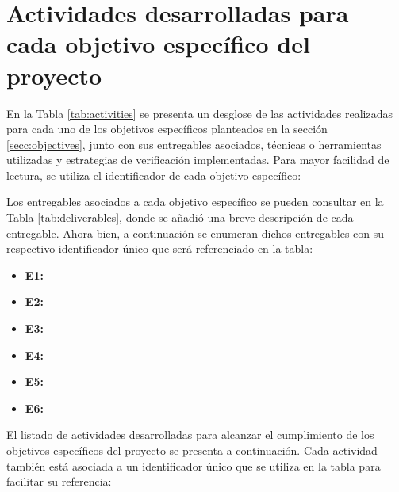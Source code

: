 \section{Actividades desarrolladas para cada objetivo específico del proyecto}

En la Tabla \ref{tab:activities} se presenta un desglose de las actividades realizadas para cada uno de los objetivos específicos planteados en la sección \ref{secc:objectives}, junto con sus entregables asociados, técnicas o herramientas utilizadas y estrategias de verificación implementadas. Para mayor facilidad de lectura, se utiliza el identificador de cada objetivo específico:

\objectives

Los entregables asociados a cada objetivo específico se pueden consultar en la Tabla \ref{tab:deliverables}, donde se añadió una breve descripción de cada entregable. Ahora bien, a continuación se enumeran dichos entregables con su respectivo identificador único que será referenciado en la tabla:

\begin{itemize}
    \item \textbf{E1:} \deliverablearch
    \item \textbf{E2:} \deliverabledet
    \item \textbf{E3:} \deliverableos
    \item \textbf{E4:} \deliverablerec
    \item \textbf{E5:} \deliverablerep
    \item \textbf{E6:} \deliverableperf
\end{itemize}

El listado de actividades desarrolladas para alcanzar el cumplimiento de los objetivos específicos del proyecto se presenta a continuación. Cada actividad también está asociada a un identificador único que se utiliza en la tabla para facilitar su referencia:

